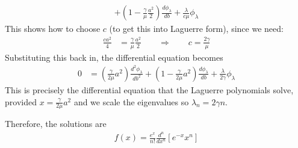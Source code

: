\documentclass[12pt]{article}
\theoremstyle{plain}
\theoremstyle{definition}
\theoremstyle{remark}
\begin{document}
\begin{enumerate}
\begin{enumerate}
\begin{align*}
            +
           \left(
           1-\frac{\gamma}{\mu} \frac{a^2}{2}
           \right)
           \frac{d \phi_\lambda}{d b}
            + \frac{\lambda}{c\mu} \phi_\lambda
        \end{align*}
        This shows how to choose $c$ (to get this into Laguerre form),
        since we need:
        \begin{align*}
          \frac{ca^2}{4} &= \frac{\gamma}{\mu} \frac{a^2}{2}
          \qquad \Rightarrow\qquad
          c = \frac{2\gamma}{\mu}
        \end{align*}
        Substituting this back in, the differential equation becomes
        \begin{align*}
          0&=
            \left(\frac{\gamma}{2\mu} a^2\right)
            \frac{d^2 \phi_\lambda}{d b^2}
            +
           \left(
           1-\frac{\gamma}{2\mu} a^2
           \right)
           \frac{d \phi_\lambda}{d b}
            + \frac{\lambda}{2\gamma} \phi_\lambda
        \end{align*}
        This is precisely the differential equation that the Laguerre
        polynomials solve, provided $x=\frac{\gamma}{2\mu} a^2$ and
        we scale the eigenvalues so $\lambda_n=2\gamma n$.

        Therefore, the solutions are
        \begin{align*}
          f(x) = \frac{e^x}{n!} \frac{d^n}{dx^n} \left[ e^{-x} x^n\right]
        \end{align*}

    \end{enumerate}

\end{enumerate}
\end{document}
